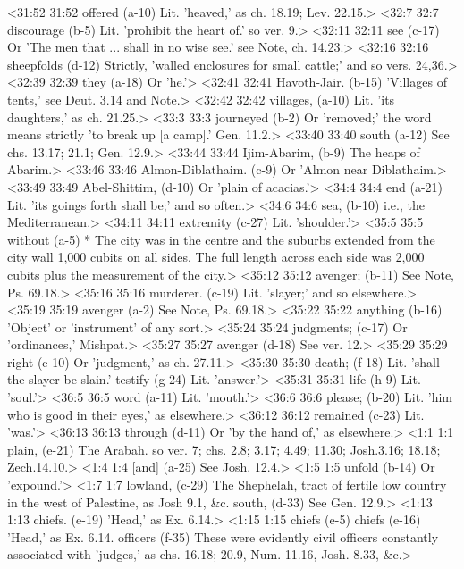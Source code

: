 <31:52 31:52  offered (a-10)  Lit. 'heaved,' as ch. 18.19; Lev. 22.15.>
<32:7 32:7  discourage (b-5)  Lit. 'prohibit the heart of.' so ver. 9.>
<32:11 32:11  see (c-17)  Or 'The men that ... shall in no wise see.' see Note, ch.  14.23.>
<32:16 32:16  sheepfolds (d-12)  Strictly, 'walled enclosures for small cattle;' and so vers.  24,36.>
<32:39 32:39  they (a-18)  Or 'he.'>
<32:41 32:41  Havoth-Jair. (b-15)  'Villages of tents,' see Deut. 3.14 and Note.>
<32:42 32:42  villages, (a-10)  Lit. 'its daughters,' as ch. 21.25.>
<33:3 33:3  journeyed (b-2)  Or 'removed;' the word means strictly 'to break up [a camp].'  Gen. 11.2.>
<33:40 33:40  south (a-12)  See chs. 13.17; 21.1; Gen. 12.9.>
<33:44 33:44  Ijim-Abarim, (b-9)  The heaps of Abarim.>
<33:46 33:46  Almon-Diblathaim. (c-9)  Or 'Almon near Diblathaim.>
<33:49 33:49  Abel-Shittim, (d-10)  Or 'plain of acacias.'>
<34:4 34:4  end (a-21)  Lit. 'its goings forth shall be;' and so often.>
<34:6 34:6  sea, (b-10)  i.e., the Mediterranean.>
<34:11 34:11  extremity (c-27)  Lit. 'shoulder.'>
<35:5 35:5  without (a-5)  * The city was in the centre and the suburbs extended from  the city wall 1,000 cubits on all sides. The full length across  each side was 2,000 cubits plus the measurement of the city.>
<35:12 35:12  avenger; (b-11)  See Note, Ps. 69.18.>
<35:16 35:16  murderer. (c-19)  Lit. 'slayer;' and so elsewhere.>
<35:19 35:19  avenger (a-2)  See Note, Ps. 69.18.>
<35:22 35:22  anything (b-16)  'Object' or 'instrument' of any sort.>
<35:24 35:24  judgments; (c-17)  Or 'ordinances,' Mishpat.>
<35:27 35:27  avenger (d-18)  See ver. 12.>
<35:29 35:29  right (e-10)  Or 'judgment,' as ch. 27.11.>
<35:30 35:30  death; (f-18)  Lit. 'shall the slayer be slain.'
  testify (g-24)  Lit. 'answer.'>
<35:31 35:31  life (h-9)  Lit. 'soul.'>
<36:5 36:5  word (a-11)  Lit. 'mouth.'>
<36:6 36:6  please; (b-20)  Lit. 'him who is good in their eyes,' as elsewhere.>
<36:12 36:12  remained (c-23)  Lit. 'was.'>
<36:13 36:13  through (d-11)  Or 'by the hand of,' as elsewhere.>
<1:1 1:1  plain, (e-21)  The Arabah. so ver. 7; chs. 2.8; 3.17; 4.49; 11.30;  Josh.3.16; 18.18; Zech.14.10.>
<1:4 1:4  [and] (a-25)  See Josh. 12.4.>
<1:5 1:5  unfold (b-14)  Or 'expound.'>
<1:7 1:7  lowland, (c-29)  The Shephelah, tract of fertile low country in the west of  Palestine, as Josh 9.1, &c.  south, (d-33)  See Gen. 12.9.>
<1:13 1:13  chiefs. (e-19)   'Head,' as Ex. 6.14.>
<1:15 1:15  chiefs (e-5)  chiefs (e-16)
  'Head,' as Ex. 6.14.
  officers (f-35)  These were evidently civil officers constantly associated  with 'judges,' as chs. 16.18; 20.9, Num. 11.16, Josh. 8.33, &c.>
